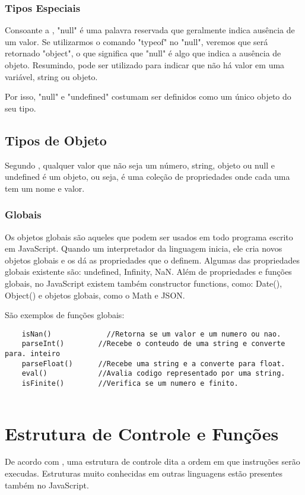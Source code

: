 	\subsubsection{Tipos Especiais}
	Consoante a \cite{flanagan2020javascript}, "null" é uma palavra reservada que geralmente indica ausência de um valor. Se utilizarmos o comando "typeof" no "null", veremos que será retornado "object", o que significa que "null" é algo que indica a ausência de objeto. Resumindo, pode ser utilizado para indicar que não há valor em uma variável, string ou objeto. 
	
	Por isso, "null" e "undefined" costumam ser definidos como um único objeto do seu tipo.
	
	
	\subsection{Tipos de Objeto}
	Segundo \cite{flanagan2020javascript}, qualquer valor que não seja um número, string, objeto ou null e undefined é um objeto, ou seja, é uma coleção de propriedades onde cada uma tem um nome e valor.
	
	\subsubsection{Globais}
	Os objetos globais são aqueles que podem ser usados em todo programa escrito em JavaScript. Quando um interpretador da linguagem inicia, ele cria novos objetos globais e os dá as propriedades que o definem. 
	Algumas das propriedades globais existente são: undefined, Infinity, NaN.
	Além de propriedades e funções globais, no JavaScript existem também constructor functions, como: Date(), Object() e objetos globais, como o Math e JSON.
	
	São exemplos de funções globais: 
	\newline
	\begin{lstlisting}
	isNan()			  	//Retorna se um valor e um numero ou nao.
	parseInt()		  //Recebe o conteudo de uma string e converte para. inteiro
	parseFloat() 	  //Recebe uma string e a converte para float.
	eval()	  		  //Avalia codigo representado por uma string.
	isFinite()		  //Verifica se um numero e finito.
	
	\end{lstlisting}
	
	
	\section{Estrutura de Controle e Funções}
	De acordo com \cite{flanagan2020javascript}, uma estrutura de controle dita a ordem em que instruções serão execudas. Estruturas muito conhecidas em outras linguagens estão presentes também no JavaScript.
	
